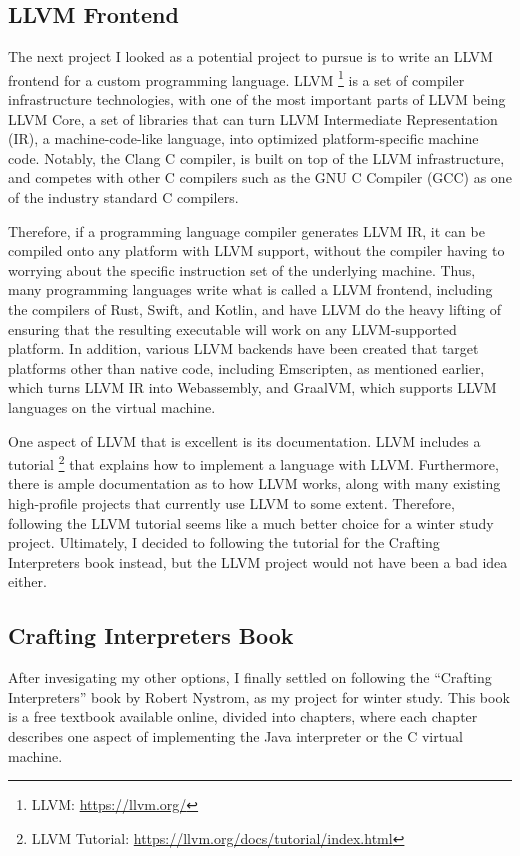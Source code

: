 \documentclass[tikz]{article}
\renewcommand{\:}{\colon}
\begin{document}
\subsection*{LLVM Frontend}
The next project I looked as a potential project to pursue is to write an LLVM frontend for a custom programming language. LLVM \footnote{LLVM: \url{https://llvm.org/}} is a set of compiler infrastructure technologies, with one of the most important parts of LLVM being LLVM Core, a set of libraries that can turn LLVM Intermediate Representation (IR), a machine-code-like language, into optimized platform-specific machine code. Notably, the Clang C compiler, is built on top of the LLVM infrastructure, and competes with other C compilers such as the GNU C Compiler (GCC) as one of the industry standard C compilers.

Therefore, if a programming language compiler generates LLVM IR, it can be compiled onto any platform with LLVM support, without the compiler having to worrying about the specific instruction set of the underlying machine. Thus, many programming languages write what is called a LLVM frontend, including the compilers of Rust, Swift, and Kotlin, and have LLVM do the heavy lifting of ensuring that the resulting executable will work on any LLVM-supported platform. In addition, various LLVM backends have been created that target platforms other than native code, including Emscripten, as mentioned earlier, which turns LLVM IR into Webassembly, and GraalVM, which supports LLVM languages on the virtual machine.

One aspect of LLVM that is excellent is its documentation. LLVM includes a tutorial \footnote{LLVM Tutorial: \url{https://llvm.org/docs/tutorial/index.html}} that explains how to implement a language with LLVM. Furthermore, there is ample documentation as to how LLVM works, along with many existing high-profile projects that currently use LLVM to some extent. Therefore, following the LLVM tutorial seems like a much better choice for a winter study project. Ultimately, I decided to following the tutorial for the Crafting Interpreters book instead, but the LLVM project would not have been a bad idea either.

\subsection*{Crafting Interpreters Book}
After invesigating my other options, I finally settled on following the ``Crafting Interpreters'' book by Robert Nystrom, as my project for winter study. This book is a free textbook available online, divided into chapters, where each chapter describes one aspect of implementing the Java interpreter or the C virtual machine.
\end{document}
